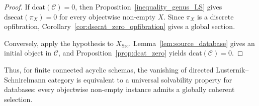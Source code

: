 \documentclass[12pt]{amsart}
\theoremstyle{definition}
\theoremstyle{remark}
\numberwithin{figure}{section}%
\newcommand{\CC}{\mathcal{C}}
\begin{document}
\begin{proof}
If \(\mathrm{dcat}(\CC)=0\), then
Proposition~\ref{inequality_genus_LS} gives
\(\mathrm{dsecat}(\pi_X)=0\) for every objectwise non-empty \(X\). Since
\(\pi_X\) is a discrete opfibration,
Corollary~\ref{cor:dsecat_zero_opfibration} gives a global section.

Conversely, apply the hypothesis to \(X_{\operatorname{Src}}\).
Lemma~\ref{lem:source_database} gives an initial object in \(\CC\), and
Proposition~\ref{prop:dcat_zero} yields
\(\mathrm{dcat}(\CC)=0\).
\end{proof}

Thus, for finite connected acyclic schemas, the vanishing of directed
Lusternik--Schnirelmann category is equivalent to a universal solvability
property for databases: every objectwise non-empty instance admits a
globally coherent selection. 



\end{document}
